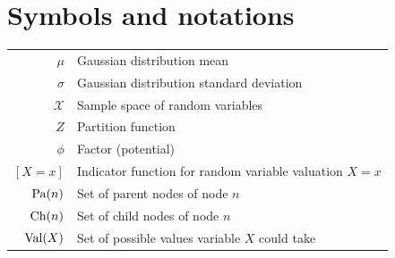 {\let\cleardoublepage\relax{} \chapter*{Symbols and notations}}
\begin{tabular}{rl}
  $\mu$ & Gaussian distribution mean\\
  $\sigma$ & Gaussian distribution standard deviation\\
  $\mathcal{X}$ & Sample space of random variables\\
  $Z$ & Partition function\\
  $\phi$ & Factor (potential)\\
  $[X=x]$ & Indicator function for random variable valuation $X=x$\\
  $\operatorname*{\text{Pa}}(n)$ & Set of parent nodes of node $n$\\
  $\operatorname*{\text{Ch}}(n)$ & Set of child nodes of node $n$\\
  $\operatorname*{\text{Val}}(X)$ & Set of possible values variable $X$ could take\\
\end{tabular}

\listoffigures

\listoftables

{\let\cleardoublepage\relax{} \listofalgorithms}

\tableofcontents
